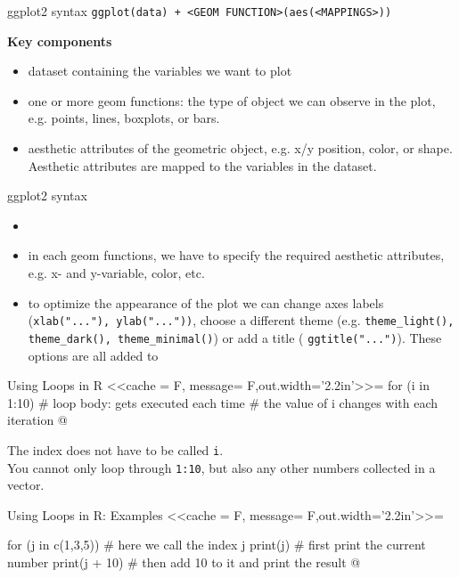 \documentclass[11pt, aspectratio = 169]{beamer}
\begin{document}
\begin{frame}{ggplot2 syntax}
\texttt{\color{teal}ggplot(data) + \color{red}<GEOM FUNCTION>(\color{blue}aes(<MAPPINGS>)\color{red})}
    
    
\textbf{Key components}
\begin{itemize}
    \item \color{teal} dataset containing the variables we want to plot 
    \item \color{red} one or more geom functions: the type of object we can observe in the plot, e.g. points, lines, boxplots, or bars.
    \item \color{vlue} aesthetic attributes of the geometric object, e.g. x/y position, color,  or shape. Aesthetic attributes are mapped to the variables in the dataset.
\end{itemize}
\end{frame}



\begin{frame}{ggplot2 syntax}
   
    \begin{itemize}
    \item {}
    \item in each geom functions, we have to specify the required aesthetic attributes, e.g. x- and y-variable, color, etc.
    \item to optimize the \alert{appearance of the plot} we can change axes labels (\texttt{xlab("..."), ylab("..."))}, choose a different theme (e.g. \texttt{theme\_light(), theme\_dark(), theme\_minimal()}) or add a title ( \texttt{ggtitle("...")}). These \alert{options are all added} to 
\end{itemize}
\end{frame}


\begin{frame}[fragile]{Using Loops in R}  \small
<<cache = F, message= F,out.width='2.2in'>>=
for (i in 1:10) {   
  # loop body: gets executed each time 
  # the value of i changes with each iteration 
}
@ 

The index does not have to be called \texttt{i}.\\

You cannot only loop through \texttt{1:10}, but also any other numbers collected in a vector.
\end{frame}

\begin{frame}[fragile]{Using Loops in R: Examples} \small
<<cache = F, message= F,out.width='2.2in'>>=

for (j in c(1,3,5)) {  # here we call the index j 
    print(j)           # first print the current number
    print(j + 10)      # then add 10 to it and print the result
}
@ 
\end{frame}
\end{document}

